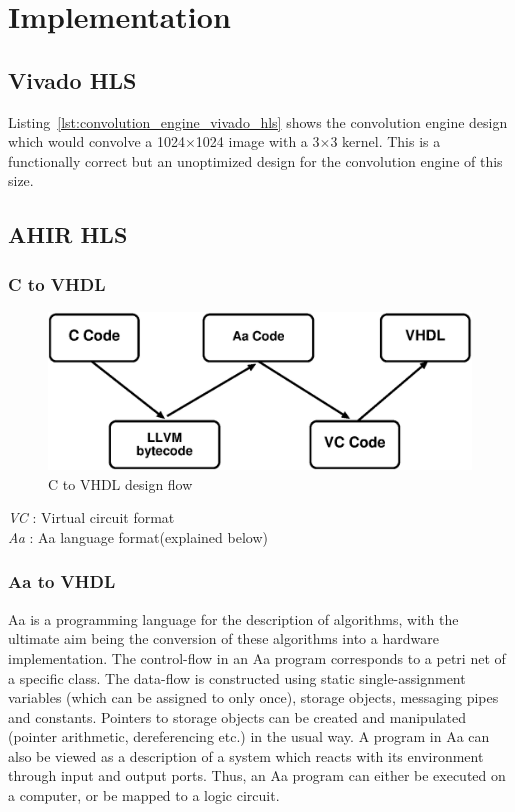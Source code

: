 \chapter{Implementation}

\section{Vivado HLS}

Listing~\ref{lst:convolution_engine_vivado_hls} shows the convolution engine design which would convolve a 1024$\times$1024 image with a
3$\times$3 kernel. This is a functionally correct but an unoptimized design for the convolution engine of this size.



\section{AHIR HLS}

\subsection{C to VHDL}

\begin{figure}[H]
\centering
\includegraphics[width=\textwidth]{eps_pdf_sources/convolution_engine/implementation/c_2_vhdl}
\caption{C to VHDL design flow}
\label{c2vhdl}
\end{figure}

\begin{flushleft}
\textit{VC} : Virtual circuit format\\
\textit{Aa} : Aa language format(explained below)
\end{flushleft}

\subsection{Aa to VHDL}

Aa is a programming language for the description of algorithms, with the ultimate aim being the conversion of these algorithms into a
hardware implementation. The control-flow in an Aa program corresponds to a petri net of a specific class. The data-flow is constructed
using static single-assignment variables (which can be assigned to only once), storage objects, messaging pipes and constants. Pointers to
storage objects can be created and manipulated (pointer arithmetic, dereferencing etc.) in the usual way. A program in Aa can also be
viewed as a description of a system which reacts with its environment through input and output ports. Thus, an Aa program can either be
executed on a computer, or be mapped to a logic circuit. 

